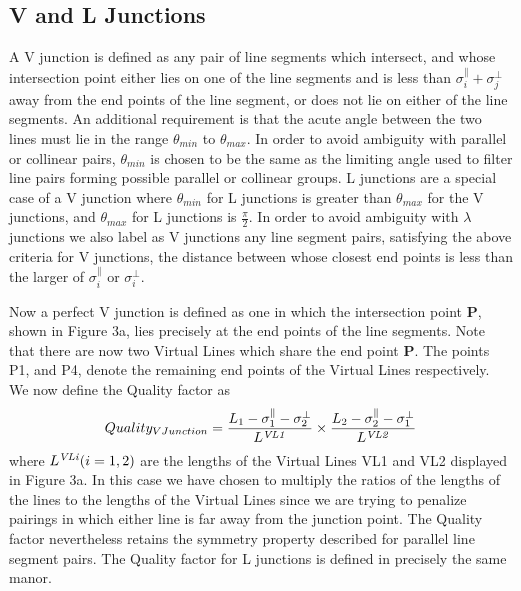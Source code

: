 \subsection{V and L Junctions}

 A V junction is defined as any pair of line segments which intersect, and
whose intersection point either lies on one of the line segments and is
less than $\sigma^{\parallel}_{i} + \sigma^{\perp}_{j}$  away from the end 
points of the line segment, or does not lie on either of the line segments.  
An additional requirement is that the acute angle between the two lines must 
lie in the range $\theta_{min}$ to $\theta_{max}$. In order to avoid 
ambiguity with parallel or collinear pairs, $\theta_{min}$ is chosen to be the
same as the limiting angle used to filter line pairs forming possible parallel 
or collinear groups. L junctions are a special case of a V junction where 
$\theta_{min}$ for L junctions is greater than  $\theta_{max}$ for the V 
junctions, and $\theta_{max}$ for L junctions is $\frac {\pi}{2}$. 
In order to avoid ambiguity with $\lambda$ junctions we also label 
as V junctions any line segment pairs, satisfying the above criteria for V 
junctions, the distance between whose closest end points is less than the 
larger of $\sigma^{\parallel}_{i}$ or $\sigma^{\perp}_{i}$.

 Now a perfect V junction is defined as one in which the intersection point 
{\bf P}, shown in Figure 3a, lies precisely at the end 
points of the line segments. Note that there are now two Virtual Lines which 
share the end point {\bf P}. The points  P1, and P4, denote the remaining end 
points of the Virtual Lines respectively. We now define the Quality factor as
\vspace{-2mm}
\begin{equation}
 Quality_{V Junction} = 
\frac {L_{1} - \sigma^{\parallel}_{1} - \sigma^{\perp}_{2}}{L^{\it VL1}} 
\times 
\frac {L_{2} - \sigma^{\parallel}_{2} - \sigma^{\perp}_{1}}{L^{\it VL2}}
\end{equation}
\vspace{-2mm}
where $L^{\it VLi} (i=1,2)$ are the lengths of the Virtual Lines VL1 and VL2
displayed in Figure 3a. In this case 
we have chosen to multiply the ratios of the lengths of the lines to the 
lengths of the Virtual Lines since we are trying to penalize pairings in which
either line is far away from the junction point. The Quality factor
nevertheless retains the symmetry property described for parallel line 
segment pairs. The Quality factor for L junctions is defined in precisely the
same manor. 

